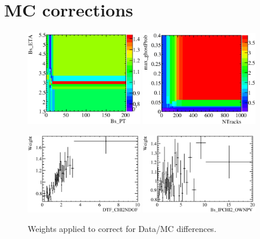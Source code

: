 
\section{MC corrections}

\begin{figure}[h]
\centering
\includegraphics[height=!,width=0.45\textwidth]{figs/dataVsMC/norm_final/weights/weights_Bs_PT_Bs_ETA_Ds2KKpi_1_t0.eps}
\includegraphics[height=!,width=0.45\textwidth]{figs/dataVsMC/norm_final/weights/weights_NTracks_max_ghostProb_Ds2KKpi_1_t0.eps}

\includegraphics[height=!,width=0.45\textwidth]{figs/dataVsMC/norm_final/weights/weights_DTF_CHI2NDOF_Ds2KKpi_1_t0.eps}
\includegraphics[height=!,width=0.45\textwidth]{figs/dataVsMC/norm_final/weights/weights_Bs_IPCHI2_OWNPV_Ds2KKpi_1_t0.eps}
\caption{Weights applied to correct for Data/MC differences.}
\label{fig:}
\end{figure}

